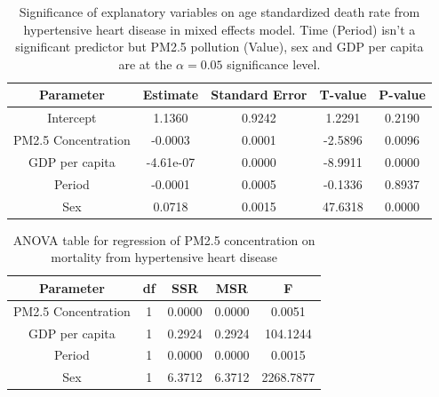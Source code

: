 \documentclass[12pt, letterpaper, twoside]{article}\usepackage[]{graphicx}\usepackage[]{xcolor}
\begin{document}
\begin{table}[h!]
\centering
\begin{tabular}{|c | c c c c|}
\toprule
Parameter & Estimate & Standard Error & T-value & P-value \\ [0.5ex]
\midrule
Intercept &	1.1360 &	0.9242 &	1.2291 &	0.2190 \\
PM2.5 Concentration &	-0.0003 &	0.0001 &	-2.5896 &	0.0096 \\
GDP per capita &	-4.61e-07 &	0.0000 &	-8.9911 &	0.0000 \\
Period &	-0.0001 &	0.0005 &	-0.1336 &	0.8937 \\
Sex &	0.0718  &	0.0015 &	47.6318 &	0.0000 \\ [1ex]
\bottomrule
\end{tabular}
\label{tab:table5}
  \caption{Significance of explanatory variables on age standardized death rate
  from hypertensive heart disease in mixed effects model. Time (Period) isn't a
  significant predictor but PM2.5 pollution (Value), sex and GDP per capita are
  at the \begin{math}\alpha = 0.05\end{math} significance level.}
\end{table}

\begin{table}[h!]
\centering
\begin{tabular}{|c | c c c c|}
\toprule
Parameter & df & SSR & MSR & F \\ [0.5ex]
\midrule
PM2.5 Concentration & 1 & 0.0000 & 0.0000 & 0.0051 \\
GDP per capita & 1 & 0.2924 & 0.2924 & 104.1244 \\
Period & 1 & 0.0000 & 0.0000 & 0.0015 \\
Sex & 1 & 6.3712 & 6.3712 & 2268.7877 \\ [1ex]
\bottomrule
\end{tabular}
\label{tab:table6}
\caption{ANOVA table for regression of PM2.5 concentration on mortality from
hypertensive heart disease}
\end{table}
\end{document}
